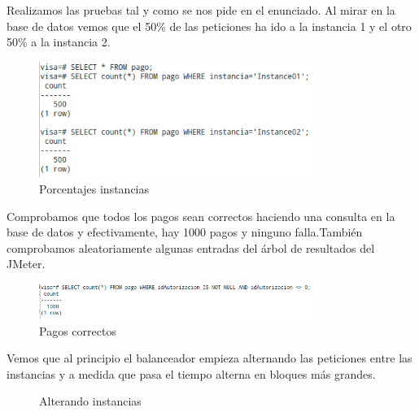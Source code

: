 \documentclass[a4paper, 10pt]{article}
\begin{document}
Realizamos las pruebas tal y como se nos pide en el enunciado.
Al mirar en la base de datos vemos que el 50\% de las peticiones ha ido a la instancia 1 y el otro 50\% a la instancia 2.

\begin{figure}[hbtp]
	\centering
	\includegraphics[width=0.8\textwidth]{../../P3/pantallazos/ej9_bd.png}
	\caption { Porcentajes instancias }
\end{figure}

Comprobamos que todos los pagos sean correctos haciendo una consulta en la base de datos y efectivamente, hay 1000 pagos y ninguno falla.También comprobamos aleatoriamente algunas entradas del árbol de resultados del JMeter.


\begin{figure}[hbtp]
	\centering
	\includegraphics[width=0.8\textwidth]{../../P3/pantallazos/ej9_pagos_correctos.png}
	\caption { Pagos correctos }
\end{figure}

Vemos que al principio el balanceador empieza alternando las peticiones entre las instancias y a medida que pasa el tiempo alterna en bloques más grandes.

\begin{figure}[htbp]
	\centering
	\caption{Alterando instancias}
\end{figure}
\end{document}
